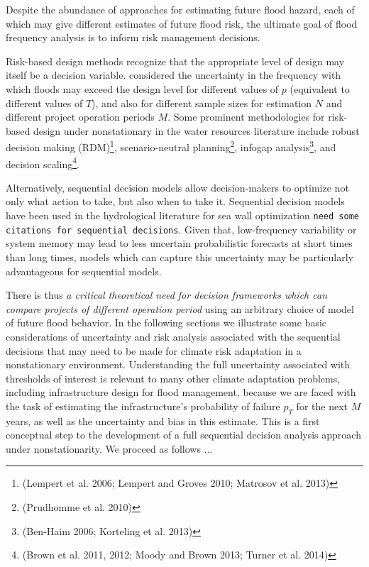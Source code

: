 \documentclass[12pt]{article}
\begin{document}
Despite the abundance of approaches for estimating future flood hazard, each of which may give different estimates of future flood risk, the ultimate goal of flood frequency analysis is to inform risk management decisions.

Risk-based design methods \citep[RBDM; see][]{Rosner2014} recognize that the appropriate level of design may itself be a decision variable.
\citet{Lall1987} considered the uncertainty in the frequency with which floods may exceed the design level for different values of \(p\) (equivalent to different values of \(T\)), and also for different sample sizes for estimation \(N\) and different project operation periods \(M\).
Some prominent methodologies for risk-based design under nonstationary in the water resources literature include robust decision making (RDM)\footnote{(Lempert et al. 2006; Lempert and Groves 2010; Matrosov et al. 2013)}, scenario-neutral planning\footnote{(Prudhomme et al. 2010)}, infogap analysis\footnote{(Ben-Haim 2006; Korteling et al. 2013)}, and decision scaling\footnote{(Brown et al. 2011, 2012; Moody and Brown 2013; Turner et al. 2014)}. 

Alternatively, sequential decision models \citep[see][]{Russell2003,Howard1960} allow decision-makers to optimize not only what action to take, but also when to take it.
Sequential decision models have been used in the hydrological literature for sea wall optimization \citep{Lickley2014}
\texttt{need some citations for sequential decisions}.
Given that, low-frequency variability or system memory may lead to less uncertain probabilistic forecasts at short times than long times, models which can capture this uncertainty may be particularly advantageous for sequential models.

There is thus \emph{a critical theoretical need for decision frameworks which can compare projects of different operation period} using an arbitrary choice of model of future flood behavior.
In the following sections we illustrate some basic considerations of uncertainty and risk analysis associated with the sequential decisions that may need to be made for climate risk adaptation in a nonstationary environment.
Understanding the full uncertainty associated with thresholds of interest is relevant to many other climate adaptation problems, including infrastructure design for flood management, because we are faced with the task of estimating the infrastructure's probability of failure \(p_T\) for the next \(M\) years, as well as the uncertainty and bias in this estimate.
This is a first conceptual step to the development of a full sequential decision analysis approach under nonstationarity.
We proceed as follows \(\ldots{}\)
\end{document}

